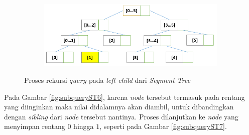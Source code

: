 \begin{figure}[H]
\begin{subfigure}{.5\textwidth}
	\end{subfigure}
	\begin{subfigure}{.5\textwidth}
		\centering
		\includegraphics[scale=0.3]{assets/images/Query_ST_8.PNG}
		\caption{}
		\label{fig:subqueryST8}
	\end{subfigure}	
	\caption{Proses rekursi \textit{$query$} pada \textit{left child} dari \textit{Segment Tree}}
	\label{fig:queryST2}
\end{figure}
\quad Pada Gambar \ref{fig:subqueryST6}, karena \textit{node} tersebut termasuk pada rentang yang diinginkan maka nilai didalamnya akan diambil, untuk dibandingkan dengan \textit{sibling} dari \textit{node} tersebut nantinya. Proses dilanjutkan ke \textit{node} yang menyimpan rentang $0$ hingga $1$, seperti pada Gambar \ref{fig:subqueryST7}.

